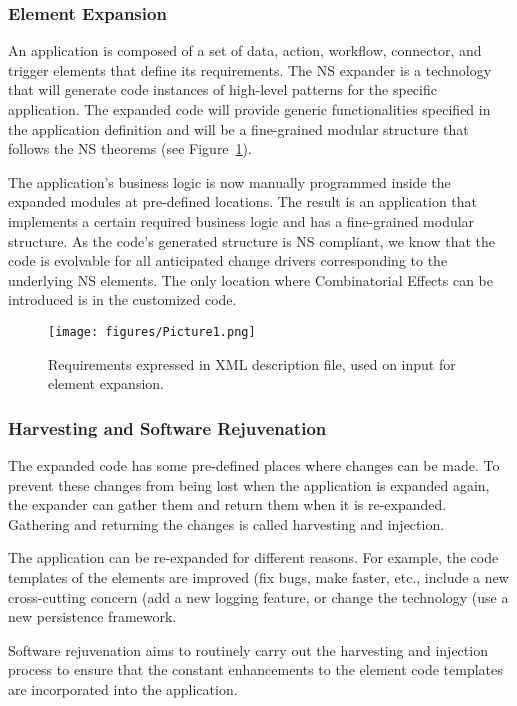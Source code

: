\subsubsection{Element Expansion}\label{Element Expansion} An application is composed of a
set of data, action, workflow, connector, and trigger elements that define its
requirements. The NS expander is a technology that will generate code instances of
high-level patterns for the specific application. The expanded code will provide generic
functionalities specified in the application definition and will be a fine-grained modular
structure that follows the NS theorems (see Figure~\ref{fig_1}).

The application's business logic is now manually programmed inside the expanded modules at
pre-defined locations. The result is an application that implements a certain required
business logic and has a fine-grained modular structure. As the code's generated structure
is NS compliant, we know that the code is evolvable for all anticipated change drivers
corresponding to the underlying NS elements. The only location where Combinatorial Effects
can be introduced is in the customized code.
\begin{figure}[htbp]
\centering
\centerline{\texttt{[image: figures/Picture1.png]}}
\caption{Requirements expressed in XML description file, used on input for element expansion.}
\label{fig_1}
\end{figure}

%
%
\subsubsection{Harvesting and Software Rejuvenation}\label{Harvesting and Software
Rejuvenation} The expanded code has some pre-defined places where changes can be made. To
prevent these changes from being lost when the application is expanded again, the expander
can gather them and return them when it is re-expanded. Gathering and returning the
changes is called harvesting and injection.

The application can be re-expanded for different reasons. For example, the code templates
of the elements are improved (fix bugs, make faster, etc., include a new cross-cutting
concern (add a new logging feature, or change the technology (use a new persistence
framework.

Software rejuvenation aims to routinely carry out the harvesting and injection process to
ensure that the constant enhancements to the element code templates are incorporated into
the application.

